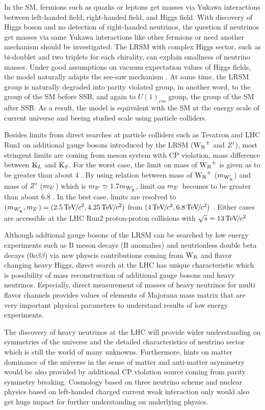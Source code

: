 In the SM, fermions such as quarks or leptons get masses via Yukawa interactions between left-handed field, right-handed field, and Higgs field. With discovery of Higgs boson \cite{20121, 201230} and no
detection of right-handed neutrinos, the question if neutrinos get masses via same Yukawa interactions like other fermions or need another mechanism should be investigated.
The LRSM with complex Higgs sector, such as bi-doublet and two triplets for each chirality, can explain smallness of neutrino masses. Under good assumptions on vacuum expectation values
of Higgs fields, the model naturally adapts the see-saw mechanism \cite{PhysRevLett.44.912}. At same time, the LRSM group is naturally degraded into parity violated group,
in another word, to the group of the SM before SSB, and again to ${U(1)}_{em}$ group, the group of the SM after SSB.
As a result, the model is equivalent with the SM at the energy scale of current universe and beeing studied scale using particle colliders.

Besides limits from direct searches at particle colliders such as Tevatron and LHC Run1 on additional gauge bosons introduced by the LRSM (${{\mathrm{W}}_{\mathrm{R}}}^{\pm}$ and ${Z}^{\prime}$), most stringent limits are
coming from meson system with CP violation, mass difference between ${\mathrm{K}}_{L}$ and ${\mathrm{K}}_{S}$. For the worst case, the limit on mass of ${{\mathrm{W}}_{\mathrm{R}}}^{\pm}$ is given as to be greater than about 4 \TeVcc.
By using relation between mass of ${{\mathrm{W}}_{\mathrm{R}}}^{\pm}$ (${m}_\mathrm{{W}_{\mathrm{R}}^{\prime}}$) and mass of ${Z}^{\prime}$ (${m}_\mathrm{{Z}^{\prime}}$) which is ${m}_\mathrm{{Z}^{\prime}} \simeq 1.7 {m}_\mathrm{{W}_{\mathrm{R}}^{\prime}}$, limit on ${m}_\mathrm{{Z}^{\prime}}$ becomes to be greater than about 6.8 \TeVcc. In the best case, 
limits are resolved to $({m}_\mathrm{{W}_{\mathrm{R}}^{\prime}}, {m}_\mathrm{{Z}^{\prime}}) = (2.5 {\,\text{Te\hspace{-.08em}V\hspace{-0.16em}/\hspace{-0.08em}}c^\text{2}}, 4.25 {\,\text{Te\hspace{-.08em}V\hspace{-0.16em}/\hspace{-0.08em}}c^\text{2}})$ from $(4 {\,\text{Te\hspace{-.08em}V\hspace{-0.16em}/\hspace{-0.08em}}c^\text{2}}, 6.8 {\,\text{Te\hspace{-.08em}V\hspace{-0.16em}/\hspace{-0.08em}}c^\text{2}})$ \cite{PhysRevD.82.055022}. Either cases are accessible at the LHC Run2 proton-proton collisions with $\sqrt{s} = 13 {\,\text{Te\hspace{-.08em}V\hspace{-0.16em}/\hspace{-0.08em}}c^\text{2}}$

Although addtional gauge bosons of the LRSM can be searched by low energy experiments such as B meson decays (B anomalies) and neutrionless double beta decays ($0\nu\beta\beta$) 
via new physcis contributions coming from ${\mathrm{W}}_{\mathrm{R}}$ and flavor changing heavy Higgs, direct search at the LHC has unique characteristic which is possibility of mass reconstruction of additional gauge
bosons and heavy neutrinos. Especially, direct measurement of masses of heavy neutrinos for multi flavor channels provides values of elements of Majorana mass matrix that are very important
physical parameters to understand results of low energy experiments.

The discovery of heavy neutrinos at the LHC will provide wider understanding on symmetries of the universe and the detailed characteristics of neutrino sector which is still the world of many unknowns.
Furthermore, hints on matter dominance of the universe in the sense of matter and anti-matter asymmetry would be also provided by additional CP violation source coming from parity symmetry breaking.
Cosmology based on three neutrino scheme and nuclear physics based on left-handed charged current weak interaction only would also get huge impact for further understanding on underlying physics.

